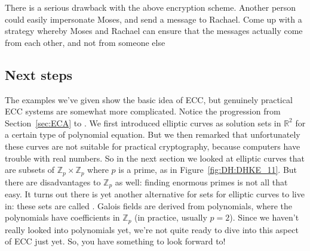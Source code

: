 \begin{exercise}{}
There is a serious drawback with the above encryption scheme. Another person could easily impersonate Moses, and send a message to Rachael. Come up with a strategy whereby Moses and Rachael can ensure that the messages actually come from each other, and not from someone else 
\end{exercise}

\subsection{Next steps}
The examples we've given show the basic idea of ECC, but genuinely practical ECC systems are somewhat more complicated. Notice the progression from Section~\ref{sec:ECA} to \label{sec:ECA2}. We first introduced elliptic curves as solution sets in $\mathbb{R}^2$ for a certain type of polynomial equation. But we then remarked that unfortunately these curves are not suitable for practical cryptography, because computers have trouble with real numbers. So in the next section we looked at elliptic curves that are subsets of $\mathbb{Z}_p \times \mathbb{Z}_p$ where $p$ is a prime, as in Figure~\ref{fig:DH:DHKE_11}. But there are disadvantages to $\mathbb{Z}_p$ as well: finding enormous primes is not all that easy. It turns out there is yet another alternative for sets for elliptic curves to live in:  these sets are called . Galois fields are derived from polynomials, where the polynomials have coefficients in $\mathbb{Z}_p$ (in practice, usually $p=2$).  Since we haven't really looked into polynomials yet, we're not quite ready to dive into this aspect of ECC just yet.  So, you have something to look forward to! 

